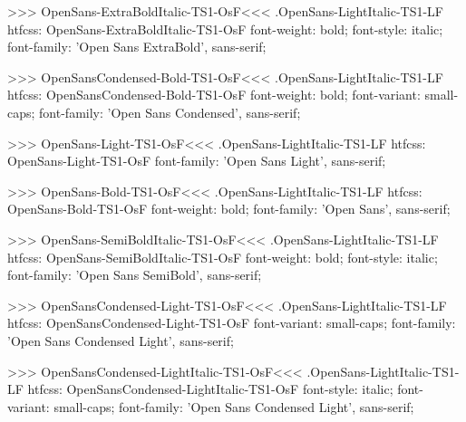>>>
\<OpenSans-ExtraBoldItalic-TS1-OsF\><<<
.OpenSans-LightItalic-TS1-LF
htfcss:  OpenSans-ExtraBoldItalic-TS1-OsF  font-weight: bold; font-style: italic; font-family: 'Open Sans ExtraBold', sans-serif;

>>>
\<OpenSansCondensed-Bold-TS1-OsF\><<<
.OpenSans-LightItalic-TS1-LF
htfcss:  OpenSansCondensed-Bold-TS1-OsF  font-weight: bold; font-variant: small-caps; font-family: 'Open Sans Condensed', sans-serif;

>>>
\<OpenSans-Light-TS1-OsF\><<<
.OpenSans-LightItalic-TS1-LF
htfcss:  OpenSans-Light-TS1-OsF  font-family: 'Open Sans Light', sans-serif;

>>>
\<OpenSans-Bold-TS1-OsF\><<<
.OpenSans-LightItalic-TS1-LF
htfcss:  OpenSans-Bold-TS1-OsF  font-weight: bold; font-family: 'Open Sans', sans-serif;

>>>
\<OpenSans-SemiBoldItalic-TS1-OsF\><<<
.OpenSans-LightItalic-TS1-LF
htfcss:  OpenSans-SemiBoldItalic-TS1-OsF  font-weight: bold; font-style: italic; font-family: 'Open Sans SemiBold', sans-serif;

>>>
\<OpenSansCondensed-Light-TS1-OsF\><<<
.OpenSans-LightItalic-TS1-LF
htfcss:  OpenSansCondensed-Light-TS1-OsF  font-variant: small-caps; font-family: 'Open Sans Condensed Light', sans-serif;

>>>
\<OpenSansCondensed-LightItalic-TS1-OsF\><<<
.OpenSans-LightItalic-TS1-LF
htfcss:  OpenSansCondensed-LightItalic-TS1-OsF  font-style: italic; font-variant: small-caps; font-family: 'Open Sans Condensed Light', sans-serif;

